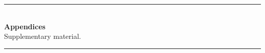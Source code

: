 \documentclass{article}
\begin{document}


\appendix
\newpage
\begin{center}
  \rule{0.5\linewidth}{0.4pt}\\[0.6em]
  {\Large\bfseries Appendices}\\[0.25em]
  {\small Supplementary material.}\\[0.4em]
  \rule{0.5\linewidth}{0.4pt}
\end{center}
\vspace{0.5em}






\end{document}
